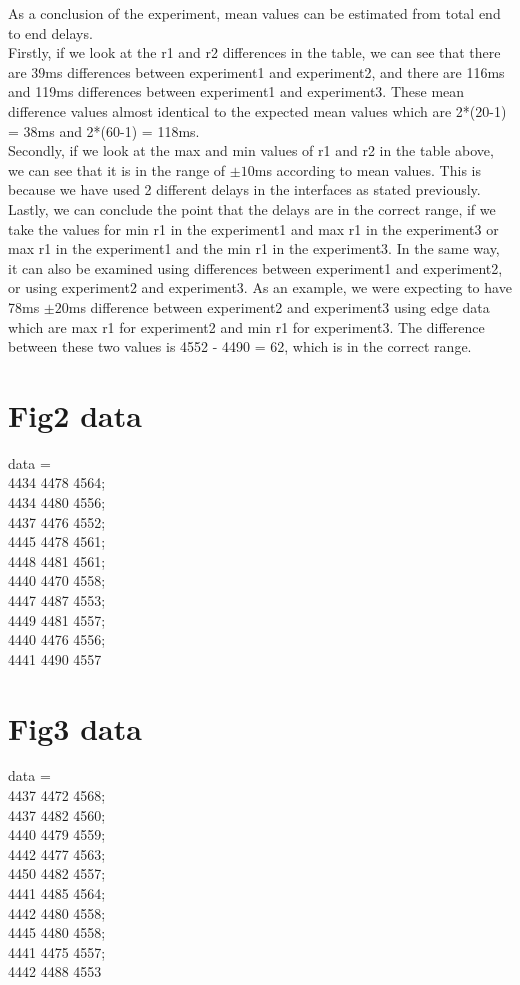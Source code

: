 \documentclass[12pt,journal,compsoc]{IEEEtran}
\begin{document}
As a conclusion of the experiment, mean values can be estimated from total end to end delays.\\
Firstly, if we look at the r1 and r2 differences in the table, we can see that there are 39ms differences between experiment1 and experiment2, and there are 116ms and 119ms differences between experiment1 and experiment3. These mean difference values almost identical to the expected mean values which are 2*(20-1) = 38ms and 2*(60-1) = 118ms.\\
Secondly, if we look at the max and min values of r1 and r2 in the table above, we can see that it is in the range of $\pm 10$ms according to mean values. This is because we have used 2 different delays in the interfaces as stated previously.\\
Lastly, we can conclude the point that the delays are in the correct range, if we take the values for min r1 in the experiment1 and max r1 in the experiment3 or max r1 in the experiment1 and the min r1 in the experiment3. In the same way, it can also be examined using differences between experiment1 and experiment2, or using experiment2 and experiment3. As an example, we were expecting to have 78ms $\pm 20$ms difference between experiment2 and experiment3 using edge data which are max r1 for experiment2 and min r1 for experiment3. The difference between these two values is 4552 - 4490 = 62, which is in the correct range.

\appendices
\section{Fig2 data}

data = \\
4434 4478 4564;\\
4434 4480 4556;\\
4437 4476 4552;\\
4445 4478 4561;\\
4448 4481 4561;\\
4440 4470 4558;\\
4447 4487 4553;\\
4449 4481 4557;\\
4440 4476 4556;\\
4441 4490 4557




\section{Fig3 data}
data = \\
4437 4472 4568;\\
4437 4482 4560;\\
4440 4479 4559;\\
4442 4477 4563;\\
4450 4482 4557;\\
4441 4485 4564;\\
4442 4480 4558;\\
4445 4480 4558;\\
4441 4475 4557;\\
4442 4488 4553
\end{document}
